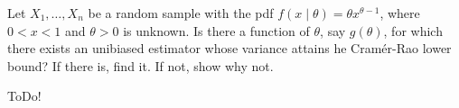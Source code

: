 
\begin{exercise}

Let $X_1, \dots, X_n$ be a random sample with the pdf $f(x \mid \theta) = \theta x^{\theta - 1}$, where $0 < x < 1$ and $\theta > 0$ is unknown.
Is there a function of $\theta$, say $g(\theta)$, for which there exists an unibiased estimator whose variance attains he Cramér-Rao lower bound?
If there is, find it.
If not, show why not.

\end{exercise}


\begin{solution}

ToDo!

\end{solution}

